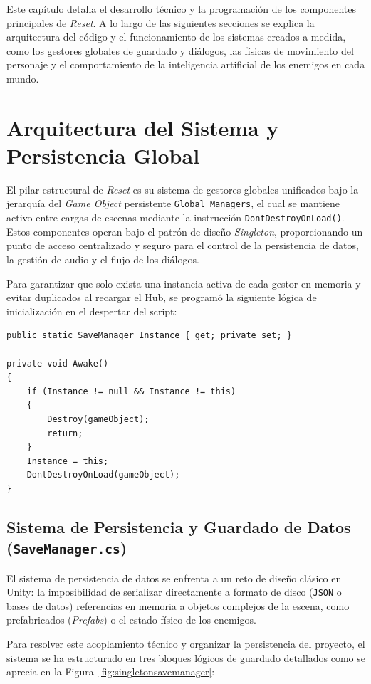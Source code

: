 Este capítulo detalla el desarrollo técnico y la programación de los componentes principales de \textit{Reset}. A lo largo de las siguientes secciones se explica la arquitectura del código y el funcionamiento de los sistemas creados a medida, como los gestores globales de guardado y diálogos, las físicas de movimiento del personaje y el comportamiento de la inteligencia artificial de los enemigos en cada mundo.

\section{Arquitectura del Sistema y Persistencia Global}
\label{sec:arquitectura_gestores}
El pilar estructural de \textit{Reset} es su sistema de gestores globales unificados bajo la jerarquía del \textit{Game Object} persistente \texttt{Global\_Managers}, el cual se mantiene activo entre cargas de escenas mediante la instrucción \texttt{DontDestroyOnLoad()}. Estos componentes operan bajo el patrón de diseño \textit{Singleton}, proporcionando un punto de acceso centralizado y seguro para el control de la persistencia de datos, la gestión de audio y el flujo de los diálogos.

Para garantizar que solo exista una instancia activa de cada gestor en memoria y evitar duplicados al recargar el Hub, se programó la siguiente lógica de inicialización en el despertar del script:

\begin{verbatim}
public static SaveManager Instance { get; private set; }

private void Awake()
{
    if (Instance != null && Instance != this)
    {
        Destroy(gameObject);
        return;
    }
    Instance = this;
    DontDestroyOnLoad(gameObject);
}
\end{verbatim}

\subsection{Sistema de Persistencia y Guardado de Datos (\texttt{SaveManager.cs})}
El sistema de persistencia de datos se enfrenta a un reto de diseño clásico en Unity: la imposibilidad de serializar directamente a formato de disco (\texttt{JSON} o bases de datos) referencias en memoria a objetos complejos de la escena, como prefabricados (\textit{Prefabs}) o el estado físico de los enemigos. 

Para resolver este acoplamiento técnico y organizar la persistencia del proyecto, el sistema se ha estructurado en tres bloques lógicos de guardado detallados como se aprecia en la Figura~\ref{fig:singletonsavemanager}:

